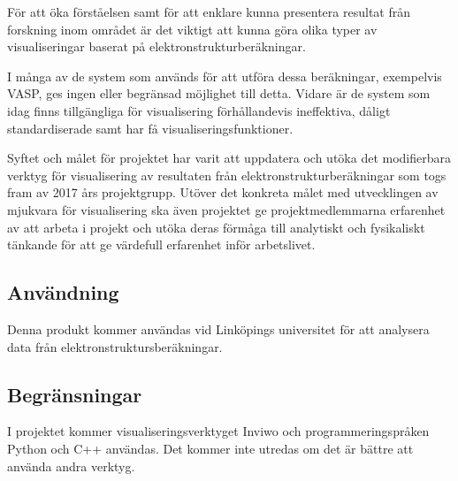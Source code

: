 \documentclass[a4paper,12pt]{article}
\begin{document}
För att öka förståelsen samt för att enklare kunna presentera resultat från forskning inom området är det viktigt att kunna göra olika typer av visualiseringar baserat på elektronstrukturberäkningar.

I många av de system som används för att utföra dessa beräkningar, exempelvis VASP, ges ingen eller begränsad möjlighet till detta. Vidare är de system som idag finns tillgängliga för visualisering förhållandevis ineffektiva, dåligt standardiserade samt har få visualiseringsfunktioner.

Syftet och målet för projektet har varit att uppdatera och utöka det modifierbara verktyg för visualisering av resultaten från elektronstrukturberäkningar som togs fram av 2017 års projektgrupp. Utöver det konkreta målet med utvecklingen av mjukvara för visualisering ska även projektet ge projektmedlemmarna erfarenhet av att arbeta i projekt och utöka deras förmåga till analytiskt och fysikaliskt tänkande för att ge värdefull erfarenhet inför arbetslivet.

\subsection{Användning}
Denna produkt kommer användas vid Linköpings universitet för att analysera data från elektronstruktursberäkningar.

\subsection{Begränsningar}
I projektet kommer visualiseringsverktyget Inviwo och
programmeringspråken Python och C++ användas. Det kommer inte utredas
om det är bättre att använda andra verktyg.
\end{document}
